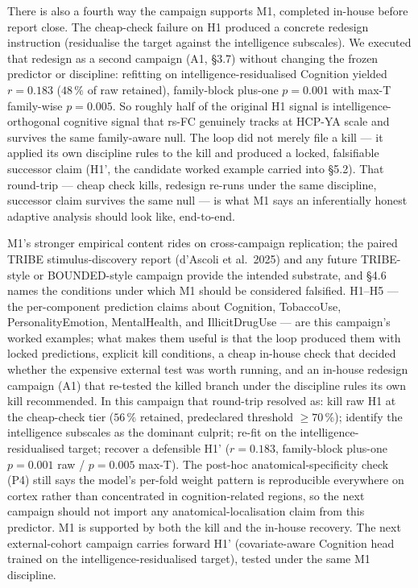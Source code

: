 \documentclass[11pt,letterpaper]{report}
\begin{document}
There is also a fourth way the campaign supports M1, completed in-house before report close. The cheap-check failure on H1 produced a concrete redesign instruction (residualise the target against the intelligence subscales). We executed that redesign as a second campaign (A1, \S3.7) without changing the frozen predictor or discipline: refitting on intelligence-residualised Cognition yielded $r = 0.183$ ($48\,\%$ of raw retained), family-block plus-one $p = 0.001$ with max-T family-wise $p = 0.005$. So roughly half of the original H1 signal is intelligence-orthogonal cognitive signal that rs-FC genuinely tracks at HCP-YA scale and survives the same family-aware null. The loop did not merely file a kill --- it applied its own discipline rules to the kill and produced a locked, falsifiable successor claim (H1', the candidate worked example carried into \S5.2). That round-trip --- cheap check kills, redesign re-runs under the same discipline, successor claim survives the same null --- is what M1 says an inferentially honest adaptive analysis should look like, end-to-end.

M1's stronger empirical content rides on cross-campaign replication; the paired TRIBE stimulus-discovery report (d'Ascoli et al.\ 2025) and any future TRIBE-style or BOUNDED-style campaign provide the intended substrate, and \S4.6 names the conditions under which M1 should be considered falsified. H1--H5 --- the per-component prediction claims about Cognition, TobaccoUse, PersonalityEmotion, MentalHealth, and IllicitDrugUse --- are this campaign's worked examples; what makes them useful is that the loop produced them with locked predictions, explicit kill conditions, a cheap in-house check that decided whether the expensive external test was worth running, and an in-house redesign campaign (A1) that re-tested the killed branch under the discipline rules its own kill recommended. In this campaign that round-trip resolved as: kill raw H1 at the cheap-check tier ($56\,\%$ retained, predeclared threshold $\ge 70\,\%$); identify the intelligence subscales as the dominant culprit; re-fit on the intelligence-residualised target; recover a defensible H1' ($r = 0.183$, family-block plus-one $p = 0.001$ raw / $p = 0.005$ max-T). The post-hoc anatomical-specificity check (P4) still says the model's per-fold weight pattern is reproducible everywhere on cortex rather than concentrated in cognition-related regions, so the next campaign should not import any anatomical-localisation claim from this predictor. M1 is supported by both the kill and the in-house recovery. The next external-cohort campaign carries forward H1' (covariate-aware Cognition head trained on the intelligence-residualised target), tested under the same M1 discipline.
\end{document}
